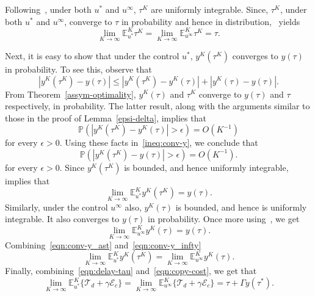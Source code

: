 \documentclass[10pt,journal,letterpaper]{IEEEtran}
\begin{document}
Following~\cite[Remark~9.5.1]{stochproc.measure-and-probability}, under both $u^{\ast}$ and $u^{\infty}$,
$\tau^K$ are uniformly integrable. Since, $\tau^K$, under both $u^{\ast}$ and $u^{\infty}$, converge to $\tau$
in probability and hence in distribution,~\cite[Theorem~9.5.1]{stochproc.measure-and-probability} yields
\begin{equation}
\lim_{K \rightarrow \infty} \mathbb{E}^K_{u^{\ast}} \tau^K =  \lim_{K \rightarrow \infty} \mathbb{E}^K_{u^{\infty}} \tau^K  = \tau \label{eqn:delay-tau}.
\end{equation}

Next, it is easy to show that under the control $u^{\ast}$, $y^K(\tau^K)$ converges
to $y(\tau)$ in probability. To see this, observe that
\begin{equation}
|y^K(\tau^K) - y(\tau)| \leq |y^K(\tau^K) - y^K(\tau)| + | y^K(\tau) - y(\tau)|. \label{ineq:conv-y}
\end{equation}
From Theorem~\ref{assym-optimality}, $y^K(\tau)$ and $\tau^K$ converge to $y(\tau)$ and $\tau$ respectively, in probability.
The latter result, along with the arguments similar to those in the proof of Lemma~\ref{epsi-delta}, implies
that
\[
\mathbb{P}\left(| y^K(\tau^K) - y^K(\tau) | > \epsilon\right) = O(K^{-1})
\]
for every $\epsilon > 0$. Using these facts in~\eqref{ineq:conv-y}, we conclude that
\[
\mathbb{P}\left(| y^K(\tau^K) - y(\tau) | > \epsilon\right) = O(K^{-1}).
\]
for every $\epsilon > 0$. Since $y^K(\tau^K)$ is bounded, and hence uniformly integrable,~\cite[Theorem~9.5.1]{stochproc.measure-and-probability}
implies that
\begin{equation}
\lim_{K \rightarrow \infty} \mathbb{E}^K_{u^{\ast}} y^K(\tau^K) = y(\tau). \label{eqn:conv-y_ast}
\end{equation}
Similarly, under the control $u^{\infty}$ also, $y^K(\tau)$ is bounded, and hence is uniformly integrable. It
also converges to  $y(\tau)$ in probability. Once more using~\cite[Theorem~9.5.1]{stochproc.measure-and-probability}, we get
\begin{equation}
\lim_{K \rightarrow \infty} \mathbb{E}^K_{u^{\infty}} y^K(\tau) = y(\tau). \label{eqn:conv-y_infty}
\end{equation}
Combining~\eqref{eqn:conv-y_ast} and~\eqref{eqn:conv-y_infty}
\begin{equation}
\lim_{K \rightarrow \infty} \mathbb{E}^K_{u^{\ast}} y^K(\tau^K) =
\lim_{K \rightarrow \infty} \mathbb{E}^K_{u^{\infty}} y^K(\tau).
\label{eqn:copy-cost}
\end{equation}
Finally, combining~\eqref{eqn:delay-tau} and~\eqref{eqn:copy-cost}, we get that
\[
\lim_{K \rightarrow \infty} \mathbb{E}^K_{u^{\ast}}\{\mathcal{T}_d + \gamma\mathcal{E}_c\} =  \lim_{K \rightarrow \infty} \mathbb{E}^K_{u^{\infty}}\{\mathcal{T}_d + \gamma\mathcal{E}_c\} = \tau + \Gamma y(\tau^{\ast}).
\]
\end{document}

